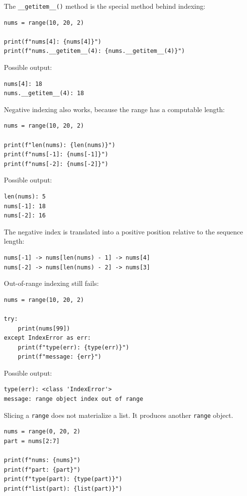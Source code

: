 \documentclass[a4paper,twoside]{report}
\begin{document}
The \texttt{\_\_getitem\_\_()} method is the special method behind indexing:

\begin{verbatim}
nums = range(10, 20, 2)

print(f"nums[4]: {nums[4]}")
print(f"nums.__getitem__(4): {nums.__getitem__(4)}")
\end{verbatim}

Possible output:

\begin{verbatim}
nums[4]: 18
nums.__getitem__(4): 18
\end{verbatim}

Negative indexing also works, because the range has a computable length:

\begin{verbatim}
nums = range(10, 20, 2)

print(f"len(nums): {len(nums)}")
print(f"nums[-1]: {nums[-1]}")
print(f"nums[-2]: {nums[-2]}")
\end{verbatim}

Possible output:

\begin{verbatim}
len(nums): 5
nums[-1]: 18
nums[-2]: 16
\end{verbatim}

The negative index is translated into a positive position relative to the sequence length:

\begin{verbatim}
nums[-1] -> nums[len(nums) - 1] -> nums[4]
nums[-2] -> nums[len(nums) - 2] -> nums[3]
\end{verbatim}

Out-of-range indexing still fails:

\begin{verbatim}
nums = range(10, 20, 2)

try:
    print(nums[99])
except IndexError as err:
    print(f"type(err): {type(err)}")
    print(f"message: {err}")
\end{verbatim}

Possible output:

\begin{verbatim}
type(err): <class 'IndexError'>
message: range object index out of range
\end{verbatim}

Slicing a \texttt{range} does not materialize a list. It produces another \texttt{range} object.

\begin{verbatim}
nums = range(0, 20, 2)
part = nums[2:7]

print(f"nums: {nums}")
print(f"part: {part}")
print(f"type(part): {type(part)}")
print(f"list(part): {list(part)}")
\end{verbatim}
\end{document}
